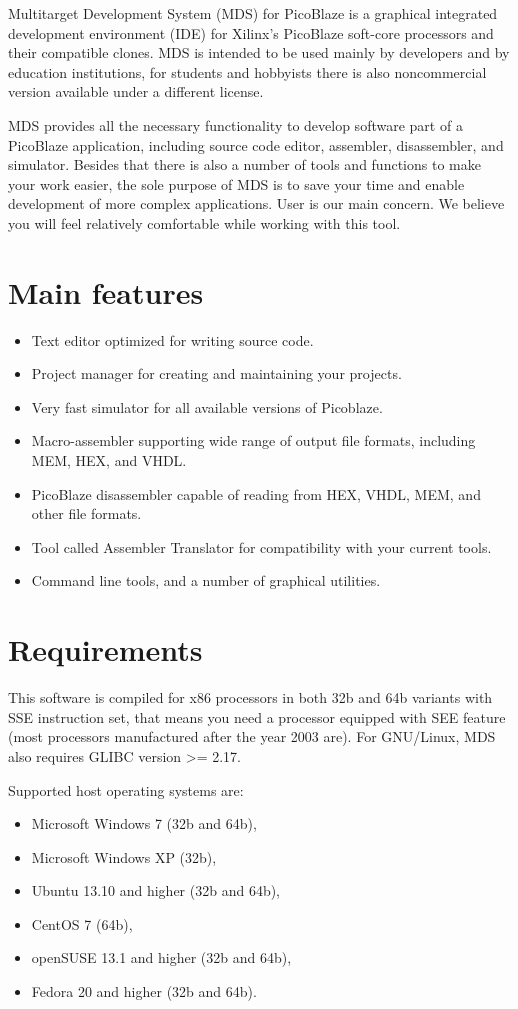 Multitarget Development System (MDS) for PicoBlaze is a graphical integrated development environment (IDE) for Xilinx's PicoBlaze soft-core processors and their compatible clones. MDS is intended to be used mainly by developers and by education institutions, for students and hobbyists there is also noncommercial version available under a different license.

MDS provides all the necessary functionality to develop software part of a PicoBlaze application, including source code editor, assembler, disassembler, and simulator. Besides that there is also a number of tools and functions to make your work easier, the sole purpose of MDS is to save your time and enable development of more complex applications. User is our main concern. We believe you will feel relatively comfortable while working with this tool.

\section{Main features}
    \begin{itemize}
        \item Text editor optimized for writing source code.
        \item Project manager for creating and maintaining your projects.
        \item Very fast simulator for all available versions of Picoblaze.
        \item Macro-assembler supporting wide range of output file formats, including MEM, HEX, and VHDL.
        \item PicoBlaze disassembler capable of reading from HEX, VHDL, MEM, and other file formats.
        \item Tool called Assembler Translator for compatibility with your current tools.
        \item Command line tools, and a number of graphical utilities.
    \end{itemize}

\clearpage
\section{Requirements}
    This software is compiled for x86 processors in both 32b and 64b variants with SSE instruction set, that means you
    need a processor equipped with SEE feature (most processors manufactured after the year 2003 are). For GNU/Linux,
    MDS also requires GLIBC version >= 2.17.

    Supported host operating systems are:
    \begin{itemize}
        \item Microsoft Windows 7 (32b and 64b),
        \item Microsoft Windows XP (32b),
        \item Ubuntu 13.10 and higher (32b and 64b),
        \item CentOS 7 (64b),
        \item openSUSE 13.1 and higher (32b and 64b),
        \item Fedora 20 and higher (32b and 64b).
    \end{itemize}
